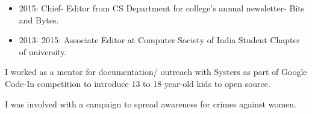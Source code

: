 \documentclass[9.5pt,a4paper]{altacv}
\begin{document}
\begin{itemize}
\item 2015: Chief- Editor from CS Department for college’s annual newsletter- Bits and Bytes.
\item 2013- 2015: Associate Editor at Computer Society of India Student Chapter of university. 
\end{itemize}


I worked as a mentor for documentation/ outreach with Systers as part of Google Code-In competition to introduce 13 to 18 year-old kids to open source.

I was involved with a campaign to spread awareness for crimes against women.

\end{document}
